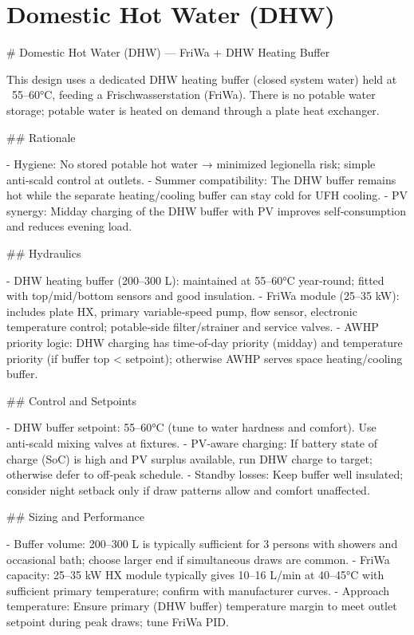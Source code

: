 \documentclass[11pt,oneside]{report}
\begin{document}
\chapter{Domestic Hot Water (DHW)}
\begin{markdown}
# Domestic Hot Water (DHW) — FriWa + DHW Heating Buffer

This design uses a dedicated DHW heating buffer (closed system water) held at ~55–60°C, feeding a Frischwasserstation (FriWa). There is no potable water storage; potable water is heated on demand through a plate heat exchanger.

## Rationale

- Hygiene: No stored potable hot water → minimized legionella risk; simple anti‑scald control at outlets.
- Summer compatibility: The DHW buffer remains hot while the separate heating/cooling buffer can stay cold for UFH cooling.
- PV synergy: Midday charging of the DHW buffer with PV improves self‑consumption and reduces evening load.

## Hydraulics

- DHW heating buffer (200–300 L): maintained at 55–60°C year‑round; fitted with top/mid/bottom sensors and good insulation.
- FriWa module (25–35 kW): includes plate HX, primary variable‑speed pump, flow sensor, electronic temperature control; potable‑side filter/strainer and service valves.
- AWHP priority logic: DHW charging has time‑of‑day priority (midday) and temperature priority (if buffer top < setpoint); otherwise AWHP serves space heating/cooling buffer.

## Control and Setpoints

- DHW buffer setpoint: 55–60°C (tune to water hardness and comfort). Use anti‑scald mixing valves at fixtures.
- PV‑aware charging: If battery state of charge (SoC) is high and PV surplus available, run DHW charge to target; otherwise defer to off‑peak schedule.
- Standby losses: Keep buffer well insulated; consider night setback only if draw patterns allow and comfort unaffected.

## Sizing and Performance

- Buffer volume: 200–300 L is typically sufficient for 3 persons with showers and occasional bath; choose larger end if simultaneous draws are common.
- FriWa capacity: 25–35 kW HX module typically gives 10–16 L/min at 40–45°C with sufficient primary temperature; confirm with manufacturer curves.
- Approach temperature: Ensure primary (DHW buffer) temperature margin to meet outlet setpoint during peak draws; tune FriWa PID.


\end{markdown}
\end{document}

